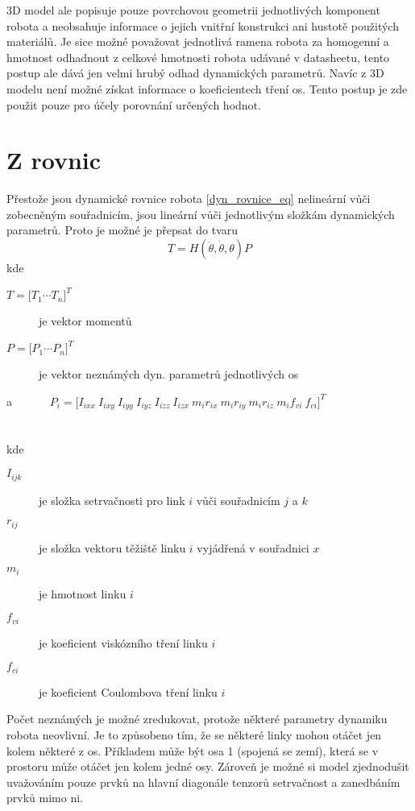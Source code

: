 3D model ale popisuje pouze povrchovou geometrii jednotlivých komponent robota a neobsahuje informace o jejich vnitřní konstrukci ani hustotě použitých materiálů. Je sice možné považovat jednotlivá ramena robota za homogenní a hmotnost
odhadnout z celkové hmotnosti robota udávané v datasheetu, tento postup ale dává jen velmi hrubý odhad dynamických parametrů. Navíc z 3D modelu není možné získat informace o koeficientech tření os. 
Tento postup je zde použit pouze pro účely porovnání určených hodnot.

\section{Z rovnic}

Přestože jsou dynamické rovnice robota \ref{dyn_rovnice_eq} nelineární vůči zobecněným souřadnicím, jsou lineární vůči jednotlivým složkám dynamických parametrů. Proto je možné je přepsat do tvaru
\begin{equation}
T = H(\ddot{\theta},\dot{\theta},\theta)P
\label{eq_lin_par}
\end{equation}
kde
\begin{description}
\item[$T = {\big[T_1  \dotsm  T_n\big]}^{T}$] je vektor momentů 
\item[$P = {\big[P_1  \dotsm  P_n\big]}^{T}$] je vektor neznámých dyn. parametrů jednotlivých os
\end{description} \noindent
a \ \ \ \ \ \ $P_i = {\big[I_{ixx} \ I_{ixy} \ I_{iyy} \ I_{iyz} \ I_{izz} \ I_{izx} \ m_ir_{ix} \ m_ir_{iy} \ m_ir_{iz} \ m_i f_{vi} \ f_{ci}\big]}^{T}$ \\
\\
\\
kde
\noindent
\begin{description}
\item[$I_{ijk}$] je složka setrvačnosti pro link $i$ vůči souřadnicím $j$ a $k$
\item[$r_{ij}$] je složka vektoru těžiště linku $i$ vyjádřená v souřadnici $x$
\item[$m_{i}$] je hmotnost linku $i$
\item[$f_{vi}$] je koeficient viskózního tření linku $i$
\item[$f_{ci}$] je koeficient Coulombova tření linku $i$
\end{description}

Počet neznámých je možné zredukovat, protože některé parametry dynamiku robota neovlivní. Je to způsobeno tím, že se některé linky mohou otáčet jen kolem některé z os. Příkladem může být osa 1 (spojená se zemí), která se v prostoru může otáčet jen kolem jedné osy. Zároveň je možné si model zjednodušit uvažováním pouze prvků na hlavní diagonále tenzorů setrvačnost a zanedbáním prvků mimo ni.

